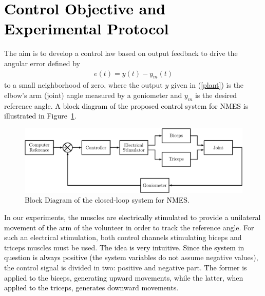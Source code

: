\documentclass[review]{elsarticle}
\begin{document}
\newpage


\section{\textcolor{black}{Control Objective and Experimental Protocol}}


The aim is to develop a control law based on output feedback to drive the angular error defined by 
%
\begin{eqnarray}\label{error}
e(t)=y(t)-y_m(t) 
\end{eqnarray}
%
to a small neighborhood of zero, where the output $y$ given in (\ref{plant}) is the elbow's arm (joint) angle measured by a goniometer
and $y_m$ is the desired reference angle. \textcolor{black}{A block diagram of the proposed control system for NMES is illustrated in Figure~\ref{supercoco}.} 
\begin{figure}[!htb]
\includegraphics[width=12cm]{FigI2.pdf}
\caption{\textcolor{black}{Block Diagram of the closed-loop system for NMES.}}
\label{supercoco}
\end{figure}


In our experiments, \textcolor{black}{the muscles are electrically
stimulated to provide a unilateral movement of the arm} of the volunteer
in order to track the reference angle. For such an electrical stimulation,
both control channels stimulating biceps and triceps muscles must
be used. \textcolor{black}{The idea is very intuitive. Since the system
in question is always positive \cite{FR:2000} (the system variables
}\textcolor{black}{do not} assume negative values), the control signal
is divided in two: positive and negative part. \textcolor{black}{The
former is applied to the biceps, generating upward movements, while
the latter, when applied to the triceps, generates downward movements.}
\end{document}
